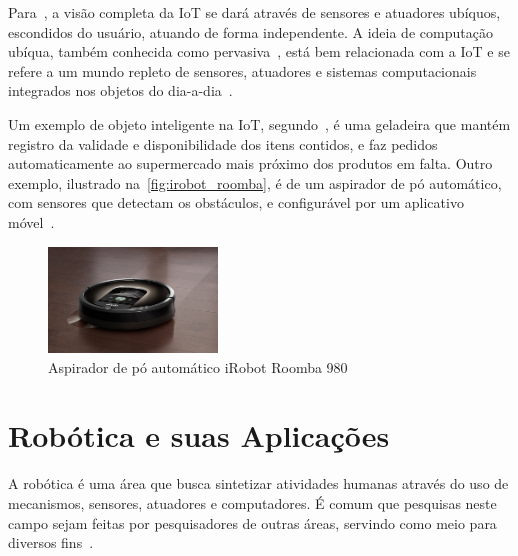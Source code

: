 Para~, a visão completa da IoT se dará através de sensores e atuadores ubíquos, escondidos do usuário, atuando de forma independente. A ideia de computação ubíqua, também conhecida como pervasiva~\cite{satyanarayanan:2001pervasive}, está bem relacionada com a IoT e se refere a um mundo repleto de sensores, atuadores e sistemas computacionais integrados nos objetos do dia-a-dia~\cite{gubbi:2013iot}.

Um exemplo de objeto inteligente na IoT, segundo~, é uma geladeira que mantém registro da validade e disponibilidade dos itens contidos, e faz pedidos automaticamente ao supermercado mais próximo dos produtos em falta. Outro exemplo, ilustrado na~\autoref{fig:irobot_roomba}, é de um aspirador de pó automático, com sensores que detectam os obstáculos, e configurável por um aplicativo móvel~\cite{irobot:roomba980}.

\begin{figure}[ht]
	\caption{\label{fig:irobot_roomba}Aspirador de pó automático iRobot Roomba 980}
	\begin{center}
	    \includegraphics[width=0.4\textwidth]{resources/irobot_roomba}
	\end{center}
\end{figure}

\section{Robótica e suas Aplicações}
\label{sec:robotica}

A robótica é uma área que busca sintetizar atividades humanas através do uso de mecanismos, sensores, atuadores e computadores. É comum que pesquisas neste campo sejam feitas por pesquisadores de outras áreas, servindo como meio para diversos fins~\cite{craig:2005}.

